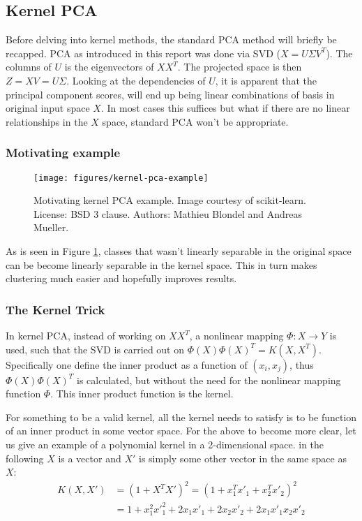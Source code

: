 \subsection{Kernel PCA}

Before delving into kernel methods, the standard PCA method will briefly be recapped.
PCA as introduced in this report was done via SVD ($X = U\Sigma V^T$). The columns of $U$ is the eigenvectors of $XX^T$. The projected space is then $Z = XV = U\Sigma$. 
Looking at the dependencies of $U$, it is apparent that the principal component scores, will end up being linear combinations of basis in original input space $X$. 
In most cases this suffices but what if there are no linear relationships in the $X$ space, standard PCA won't be appropriate.

\subsubsection{Motivating example}
\begin{figure}[H]
	\center
	\texttt{[image: figures/kernel-pca-example]}
	\caption{Motivating kernel PCA example. Image courtesy of scikit-learn. License: BSD 3 clause. Authors: Mathieu Blondel and Andreas Mueller.}
	\label{fig:kernel-pca-example}
\end{figure}

As is seen in Figure \ref{fig:kernel-pca-example}, classes that wasn't linearly separable in the original space can be become linearly separable in the kernel space. This in turn makes clustering much easier and hopefully improves results.

\subsubsection{The Kernel Trick}

In kernel PCA, instead of working on $X X^T$, a nonlinear mapping $\Phi: X\rightarrow Y$ is used, such that the SVD is carried out on $\Phi(X)\Phi(X)^T = K(X, X^T)$. Specifically one define the inner product as a function of $(x_i, x_j)$, thus $\Phi(X)\Phi(X)^T$ is calculated, but without the need for the nonlinear mapping function $\Phi$. This inner product function is the kernel.
 
For something to be a valid kernel, all the kernel needs to satisfy is to be function of an inner product in some vector space.
For the above to become more clear, let us give an example of a polynomial kernel in a 2-dimensional space. in the following $X$ is a vector and $X'$ is simply some other vector in the same space as $X$:
\begin{equation}
\begin{split}
K(X,X') &= (1+X^T X')^2 = (1+x_1^T x'_1+x_2^T x'_2)^2 \\
&= 1+x_1^2 {x'}_1^2 +2 x_1 x'_1 + 2 x_2 x'_2 + 2 x_1 x'_1 x_2 x'_2
\end{split}
\end{equation}

